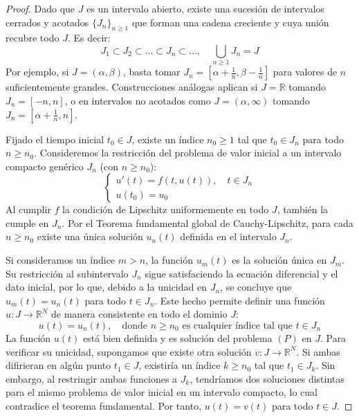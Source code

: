 \begin{proof}
    Dado que $J$ es un intervalo abierto, existe una sucesión de intervalos cerrados y acotados $\{J_n\}_{n \geq 1}$ que forman una cadena creciente y cuya unión recubre todo $J$. Es decir:
    \[
        J_1 \subset J_2 \subset \ldots \subset J_n \subset \ldots, \quad \bigcup_{n \geq 1} J_n = J
    \]
    Por ejemplo, si $J = (\alpha, \beta)$, basta tomar $J_n = [\alpha + \frac{1}{n}, \beta - \frac{1}{n}]$ para valores de $n$ suficientemente grandes. Construcciones análogas aplican si $J = \mathbb{R}$ tomando $J_n = [-n, n]$, o en intervalos no acotados como $J = (\alpha, \infty)$ tomando $J_n = [\alpha + \frac{1}{n}, n]$.

    Fijado el tiempo inicial $t_0 \in J$, existe un índice $n_0 \geq 1$ tal que $t_0 \in J_n$ para todo $n \geq n_0$. Consideremos la restricción del problema de valor inicial a un intervalo compacto genérico $J_n$ (con $n \geq n_0$):
    \[
        \begin{cases}
            u'(t) = f(t, u(t)), \quad t \in J_n \\
            u(t_0) = u_0
        \end{cases}
    \]
    Al cumplir $f$ la condición de Lipschitz uniformemente en todo $J$, también la cumple en $J_n$. Por el Teorema fundamental global de Cauchy-Lipschitz, para cada $n \geq n_0$ existe una única solución $u_n(t)$ definida en el intervalo $J_n$. 
    
    Si consideramos un índice $m > n$, la función $u_m(t)$ es la solución única en $J_m$. Su restricción al subintervalo $J_n$ sigue satisfaciendo la ecuación diferencial y el dato inicial, por lo que, debido a la unicidad en $J_n$, se concluye que $u_m(t) = u_n(t)$ para todo $t \in J_n$. Este hecho permite definir una función $u : J \to \mathbb{R}^N$ de manera consistente en todo el dominio $J$:
    \[
        u(t) = u_n(t), \quad \text{donde } n \geq n_0 \text{ es cualquier índice tal que } t \in J_n
    \]
    La función $u(t)$ está bien definida y es solución del problema $(P)$ en $J$. Para verificar su unicidad, supongamos que existe otra solución $v : J \to \mathbb{R}^N$. Si ambas difirieran en algún punto $t_1 \in J$, existiría un índice $k \geq n_0$ tal que $t_1 \in J_k$. Sin embargo, al restringir ambas funciones a $J_k$, tendríamos dos soluciones distintas para el mismo problema de valor inicial en un intervalo compacto, lo cual contradice el teorema fundamental. Por tanto, $u(t) = v(t)$ para todo $t \in J$.
\end{proof}


